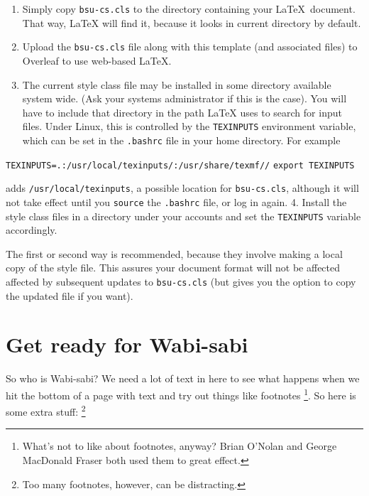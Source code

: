 \documentclass[
  dissertation]{bsu-cs}
\providecommand{\tightlist}{%
  \setlength{\itemsep}{0pt}\setlength{\parskip}{0pt}}\usepackage{longtable,booktabs,array}
\begin{document}
\begin{enumerate}
\def\labelenumi{\arabic{enumi}.}
\tightlist
\item
  Simply copy \texttt{bsu-cs.cls} to the directory containing your
  \LaTeX~document. That way, LaTeX will find it, because it looks in
  current directory by default.
\item
  Upload the \texttt{bsu-cs.cls} file along with this template (and
  associated files) to Overleaf to use web-based LaTeX.
\item
  The current style class file may be installed in some directory
  available system wide. (Ask your systems administrator if this is the
  case). You will have to include that directory in the path LaTeX uses
  to search for input files. Under Linux, this is controlled by the
  \texttt{TEXINPUTS} environment variable, which can be set in the
  \texttt{.bashrc} file in your home directory. For example
\end{enumerate}

\texttt{TEXINPUTS=.:/usr/local/texinputs/:/usr/share/texmf//}
\texttt{export\ TEXINPUTS}

adds \texttt{/usr/local/texinputs}, a possible location for
\texttt{bsu-cs.cls}, although it will not take effect until you
\texttt{source} the \texttt{.bashrc} file, or log in again. 4. Install
the style class files in a directory under your accounts and set the
\texttt{TEXINPUTS} variable accordingly.

The first or second way is recommended, because they involve making a
local copy of the style file. This assures your document format will not
be affected affected by subsequent updates to \texttt{bsu-cs.cls} (but
gives you the option to copy the updated file if you want).

\section{Get ready for Wabi-sabi}\label{sec-getReady}

So who is Wabi-sabi? We need a lot of text in here to see what happens
when we hit the bottom of a page with text and try out things like
footnotes \footnote{What's not to like about footnotes, anyway? Brian
  O'Nolan and George MacDonald Fraser both used them to great effect.}.
So here is some extra stuff: \footnote{Too many footnotes, however, can
  be distracting.}
\end{document}
